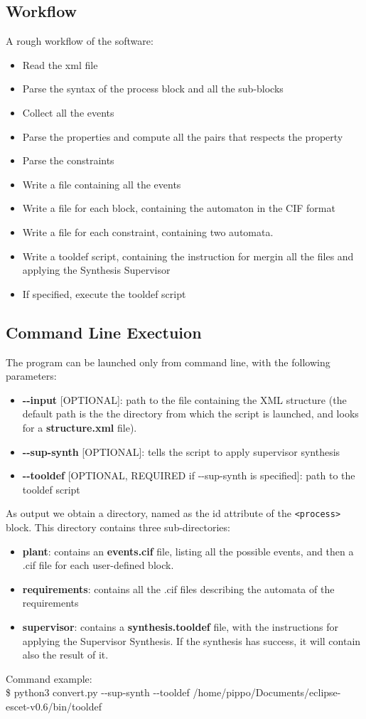 \documentclass{article}
\newcommand*{\xml}[1]{\texttt{<#1>}}
\begin{document}
\subsection{Workflow}
A rough workflow of the software:
\begin{itemize}
    \item Read the xml file
    \item Parse the syntax of the process block and all the sub-blocks
    \item Collect all the events
    \item Parse the properties and compute all the pairs that respects the property
    \item Parse the constraints
    \item Write a file containing all the events
    \item Write a file for each block, containing the automaton in the CIF format
    \item Write a file for each constraint, containing two automata.
    \item Write a tooldef script, containing the instruction for mergin all the files and applying the Synthesis Supervisor
    \item If specified, execute the tooldef script
\end{itemize}

\subsection{Command Line Exectuion}
The program can be launched only from command line, with the following parameters:
\begin{itemize}
    \item \textbf{-{}-input} [OPTIONAL]: path to the file containing the XML structure (the default path is the the directory from which the script is launched, and looks for a \textbf{structure.xml} file).
    \item \textbf{-{}-sup-synth} [OPTIONAL]: tells the script to apply supervisor synthesis
    \item \textbf{-{}-tooldef} [OPTIONAL, REQUIRED if -{}-sup-synth is specified]: path to the tooldef script
\end{itemize}

As output we obtain a directory, named as the id attribute of the \xml{process} block. This directory contains three sub-directories:
\begin{itemize}
    \item \textbf{plant}: contains an \textbf{events.cif} file, listing all the possible events, and then a .cif file for each user-defined block.
    \item \textbf{requirements}: contains all the .cif files describing the automata of the requirements
    \item \textbf{supervisor}: contains a \textbf{synthesis.tooldef} file, with the instructions for applying the Supervisor Synthesis. If the synthesis has success, it will contain also the result of it.
\end{itemize}
\noindent Command example:\\
\$ python3 convert.py -{}-sup-synth -{}-tooldef /home/pippo/Documents/eclipse-escet-v0.6/bin/tooldef 
\end{document}
